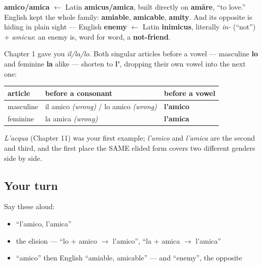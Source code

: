 \begin{cousinweb}
\textbf{amico/amica} $\leftarrow$ Latin \textbf{amicus/amica}, built directly on \textbf{amāre}, \textquotedblleft{}to love.\textquotedblright{} English kept the whole family: \textbf{amiable}, \textbf{amicable}, \textbf{amity}. And its opposite is hiding in plain sight — English \textbf{enemy} $\leftarrow$ Latin \textbf{inimicus}, literally \emph{in-} (\textquotedblleft{}not\textquotedblright{}) + \emph{amicus}: an enemy is, word for word, a \textbf{not-friend}.
\end{cousinweb}

\begin{grammarlens}[title={Grammar Lens: when \emph{lo/la} becomes \emph{l'}}]
Chapter 1 gave you \emph{il/la/lo}. Both singular articles before a vowel — masculine \textbf{lo} and feminine \textbf{la} alike — shorten to \textbf{l'}, dropping their own vowel into the next one:

\noindent
\begin{tabularx}{\linewidth}{@{}>{\raggedright\arraybackslash}X>{\raggedright\arraybackslash}X>{\raggedright\arraybackslash}X@{}}
\toprule
\textbf{article} & \textbf{before a consonant} & \textbf{before a vowel} \\
\midrule
masculine & il amico \emph{(wrong)} / lo amico \emph{(wrong)} & \textbf{l'amico} \\
feminine & la amica \emph{(wrong)} & \textbf{l'amica} \\
\bottomrule
\end{tabularx}

\emph{L'acqua} (Chapter 11) was your first example; \emph{l'amico} and \emph{l'amica} are the second and third, and the first place the SAME elided form covers two different genders side by side.
\end{grammarlens}

\subsection*{Your turn}
Say these aloud:

\begin{itemize}
\raggedright
  \item \textquotedblleft{}l'amico, l'amica\textquotedblright{}
  \item the elision — \textquotedblleft{}lo + amico $\to$ l'amico\textquotedblright{}, \textquotedblleft{}la + amica $\to$ l'amica\textquotedblright{}
  \item \textquotedblleft{}amico\textquotedblright{} then English \textquotedblleft{}amiable, amicable\textquotedblright{} — and \textquotedblleft{}enemy\textquotedblright{}, the opposite
\end{itemize}

